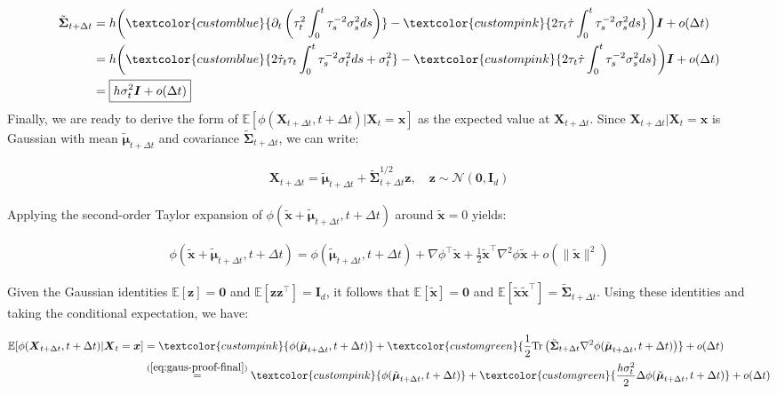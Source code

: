 \documentclass{article}
\newcommand{\bluetext}[1]{\textcolor{customblue}{#1}}
\newcommand{\greentext}[1]{\textcolor{customgreen}{#1}}
\newcommand{\pinktext}[1]{\textcolor{custompink}{#1}}
\begin{document}
\begin{align}
    \tilde{\boldsymbol{\Sigma}}_{t+\Delta t}&=h\bigg(\bluetext{\partial_t\left(\tau_t^2\int_0^t\tau_s^{-2}\sigma_s^2ds\right)}-\pinktext{2\tau_t\dot{\tau}\int_0^t\tau_s^{-2}\sigma_s^2ds}\bigg)\boldsymbol{I}+o(\Delta t)\nonumber\\
    &=h\bigg(\bluetext{2\dot{\tau}_t\tau_t\int_0^t\tau_s^{-2}\sigma_t^2ds+\sigma_t^2}-\pinktext{2\tau_t\dot{\tau}\int_0^t\tau_s^{-2}\sigma_s^2ds}\bigg)\boldsymbol{I}+o(\Delta t)\nonumber\\
    &=\boxed{h\sigma_t^2\boldsymbol{I}+o(\Delta t)}\label{eq:gaus-proof-final}
\end{align}
Finally, we are ready to derive the form of $\mathbb{E}[\phi(\boldsymbol{X}_{t+\Delta t},t+\Delta t)|\boldsymbol{X}_t=\boldsymbol{x}]$ as the expected value at $\boldsymbol{X}_{t+\Delta t}$. Since $\boldsymbol{X}_{t+\Delta t}|\boldsymbol{X}_t=\boldsymbol{x}$ is Gaussian with mean $\tilde{\boldsymbol{\mu}}_{t+\Delta t}$ and covariance $\tilde{\boldsymbol{\Sigma}}_{t+\Delta t}$, we can write:
\begin{small}
\begin{align}
    \boldsymbol{X}_{t+\Delta t}=\tilde{\boldsymbol{\mu}}_{t+\Delta t}+\tilde{\boldsymbol{\Sigma}}_{t+\Delta t}^{1/2}\boldsymbol{z}, \quad \boldsymbol{z}\sim \mathcal{N}(\boldsymbol{0}, \boldsymbol{I}_d)
\end{align}
\end{small}
Applying the second-order Taylor expansion of $\phi(\tilde{\boldsymbol{x}}+\tilde{\boldsymbol{\mu}}_{t+\Delta t} ,t+\Delta t)$ around $\tilde{\boldsymbol{x}}=0$ yields:
\begin{small}
\begin{align}
    \phi(\tilde{\boldsymbol{x}}+\tilde{\boldsymbol{\mu}}_{t+\Delta t} ,t+\Delta t)= \phi(\tilde{\boldsymbol{\mu}}_{t+\Delta t} ,t+\Delta t)+\nabla\phi^\top\tilde{\boldsymbol{x}}+\frac{1}{2}\tilde{\boldsymbol{x}}^\top \nabla^2\phi\tilde{\boldsymbol{x}}+o(\|\tilde{\boldsymbol{x}}\|^2)
\end{align}
\end{small}
Given the Gaussian identities $\mathbb{E}[\boldsymbol{z}]=\boldsymbol{0}$ and $\mathbb{E}[\boldsymbol{z}\boldsymbol{z}^\top]=\boldsymbol{I}_d$, it follows that $\mathbb{E}[\tilde{\boldsymbol{x}}]=\boldsymbol{0}$ and $\mathbb{E}[\tilde{\boldsymbol{x}}\tilde{\boldsymbol{x}}^\top]=\tilde{\boldsymbol{\Sigma}}_{t+\Delta t}$. Using these identities and taking the conditional expectation, we have:
\begin{small}
\begin{align}
    \mathbb{E}[\phi(\boldsymbol{X}_{t+\Delta t},t+\Delta t)|\boldsymbol{X}_t=\boldsymbol{x}]&=\pinktext{\phi(\tilde{\boldsymbol{\mu}}_{t+\Delta t}, t+\Delta t)}+\greentext{\frac{1}{2}\text{Tr}\left(\tilde{\boldsymbol{\Sigma}}_{t+\Delta t}\nabla^2 \phi(\tilde{\boldsymbol{\mu}}_{t+\Delta t}, t+\Delta t)\right)}+o(\Delta t)\nonumber\\
    &\overset{(\ref{eq:gaus-proof-final})}{=}\pinktext{\phi(\tilde{\boldsymbol{\mu}}_{t+\Delta t}, t+\Delta t)}+\greentext{\frac{h\sigma_t^2}{2}\Delta \phi(\tilde{\boldsymbol{\mu}}_{t+\Delta t}, t+\Delta t)}+o(\Delta t)\label{eq:gaus-exp-1}
\end{align}
\end{small}
\end{document}
